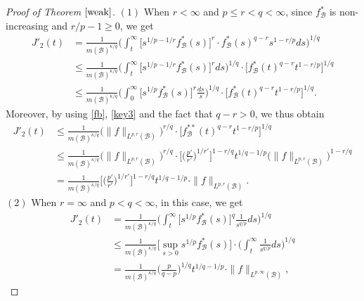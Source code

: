 \documentclass{birkjour}
\theoremstyle{definition}
\theoremstyle{remark}
\numberwithin{equation}{section}
\begin{document}
\begin{proof}[Proof of Theorem $\ref{weak}$]
$(1)$ When $r<\infty$ and $p\leq r<q<\infty$, since $f^{*}_{\mathcal{B}}$ is non-increasing and $r/p-1\geq0$, we get
\begin{equation*}
\begin{split}
J'_2(t)&=\frac{1}{m(\mathcal{B})^{\kappa/q}}\bigg(\int_{t}^{\infty}\big[s^{1/p-1/r}f^{*}_{\mathcal{B}}(s)\big]^r
\cdot f^{*}_{\mathcal{B}}(s)^{q-r}s^{1-r/p}ds\bigg)^{1/q}\\
&\leq\frac{1}{m(\mathcal{B})^{\kappa/q}}\bigg(\int_{t}^{\infty}\big[s^{1/p-1/r}f^{*}_{\mathcal{B}}(s)\big]^rds\bigg)^{1/q}
\cdot \Big[f^{*}_{\mathcal{B}}(t)^{q-r}t^{1-r/p}\Big]^{1/q}\\
&\leq\frac{1}{m(\mathcal{B})^{\kappa/q}}\bigg(\int_{0}^{\infty}\big[s^{1/p}f^{*}_{\mathcal{B}}(s)\big]^r\frac{ds}{s}\bigg)^{1/q}
\cdot \Big[f^{*}_{\mathcal{B}}(t)^{q-r}t^{1-r/p}\Big]^{1/q}.
\end{split}
\end{equation*}
Moreover, by using \eqref{fb}, \eqref{key3} and the fact that $q-r>0$, we thus obtain
\begin{equation*}
\begin{split}
J'_2(t)&\leq\frac{1}{m(\mathcal{B})^{\kappa/q}}\big(\|f\|_{L^{p,r}(\mathcal{B})}\big)^{r/q}
\cdot \Big[f^{**}_{\mathcal{B}}(t)^{q-r}t^{1-r/p}\Big]^{1/q}\\
&\leq \frac{1}{m(\mathcal{B})^{\kappa/q}}\big(\|f\|_{L^{p,r}(\mathcal{B})}\big)^{r/q}
\cdot \Big[\Big(\frac{p'}{r'}\Big)^{1/{r'}}\Big]^{1-r/q}
t^{1/q-1/p}\big(\|f\|_{L^{p,r}(\mathcal{B})}\big)^{1-r/q}\\
&=\frac{1}{m(\mathcal{B})^{\kappa/q}}\Big[\Big(\frac{p'}{r'}\Big)^{1/{r'}}\Big]^{1-r/q}
t^{1/q-1/p}\cdot\|f\|_{L^{p,r}(\mathcal{B})}.
\end{split}
\end{equation*}
$(2)$ When $r=\infty$ and $p<q<\infty$, in this case, we get
\begin{equation*}
\begin{split}
J'_2(t)&=\frac{1}{m(\mathcal{B})^{\kappa/q}}\bigg(\int_{t}^{\infty}
\big[s^{1/p}f^{*}_{\mathcal{B}}(s)\big]^{q}\frac{1}{s^{q/p}}ds\bigg)^{1/q}\\
&\leq\frac{1}{m(\mathcal{B})^{\kappa/q}}\Big[\sup_{s>0}s^{1/p}f^{*}_{\mathcal{B}}(s)\Big]
\cdot\bigg(\int_{t}^{\infty}\frac{1}{s^{q/p}}ds\bigg)^{1/q}\\
&=\frac{1}{m(\mathcal{B})^{\kappa/q}}\Big(\frac{p}{q-p}\Big)^{1/q} t^{1/q-1/p}\cdot\|f\|_{L^{p,\infty}(\mathcal{B})},
\end{split}
\end{equation*}

\end{proof}
\end{document}
